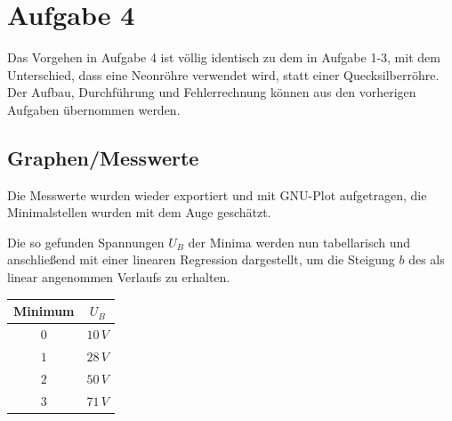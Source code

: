\section{Aufgabe 4}
Das Vorgehen in Aufgabe 4 ist völlig identisch zu dem in Aufgabe 1-3, mit dem Unterschied, dass eine Neonröhre verwendet wird, statt einer Quecksilberröhre. Der Aufbau, Durchführung und Fehlerrechnung können aus den vorherigen Aufgaben übernommen werden.
\subsection{Graphen/Messwerte}
Die Messwerte wurden wieder exportiert und mit GNU-Plot aufgetragen, die Minimalstellen wurden mit dem Auge geschätzt.
\begin{center}
\begin{minipage}{\linewidth}
\centering
{}
\label{a3}
\end{minipage}
\end{center}
Die so gefunden Spannungen \(U_B\) der Minima werden nun tabellarisch und anschließend mit einer linearen Regression dargestellt, um die Steigung \(b\) des als linear angenommen Verlaufs zu erhalten.
\begin{center}
\begin{tabular}{c|c}
Minimum & \(U_B\)\\\hline
\(0\) & \(10\, V\)\\
\(1\) & \(28\, V\)\\
\(2\) & \(50\, V\)\\
\(3\) & \(71\, V\)\\
\end{tabular}
\end{center}

